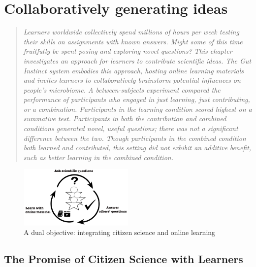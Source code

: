 \chapter{Collaboratively generating ideas}

\begin{quote}
\emph{Learners worldwide collectively spend millions of hours per week testing their skills on assignments with known answers. Might some of this time fruitfully be spent posing and exploring novel questions? This chapter investigates an approach for learners to contribute scientific ideas. The Gut Instinct system embodies this approach, hosting online learning materials and invites learners to collaboratively brainstorm potential influences on people’s microbiome. A between-subjects experiment compared the performance of participants who engaged in just learning, just contributing, or a combination. Participants in the learning condition scored highest on a summative test. Participants in both the contribution and combined conditions generated novel, useful questions; there was not a significant difference between the two. Though participants in the combined condition both learned and contributed, this setting did not exhibit an additive benefit, such as better learning in the combined condition. 
}
\end{quote}

\begin{figure}[h]
  \centering
  \includegraphics[width=0.5\textwidth]{figures/gutinstinct/gi-1.png}
  \caption[A dual objective: integrating citizen science and online learning]
{A dual objective: integrating citizen science and online learning}
  \label{fig:gi-1}
\end{figure}

\vspace{0.25in}


\section{The Promise of Citizen Science with Learners}


